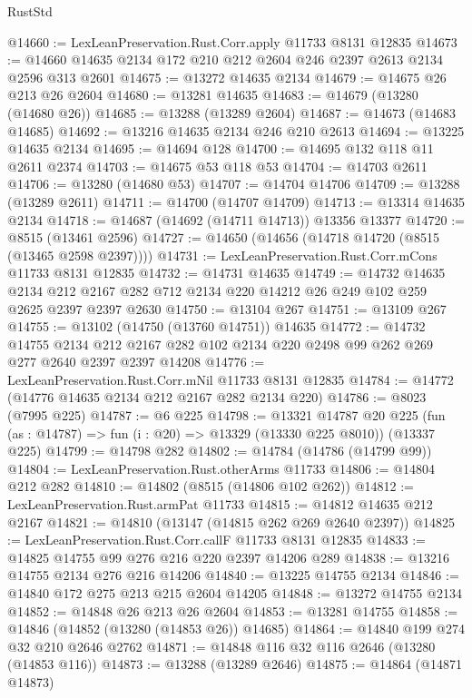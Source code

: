 \begin{lexlean}{RustStd}
\begin{coremodule}
@14660 := LexLeanPreservation.Rust.Corr.apply @11733 @8131 @12835
@14673 := @14660 @14635 @2134 @172 @210 @212 @2604 @246 @2397 @2613 @2134 @2596 @313 @2601
@14675 := @13272 @14635 @2134
@14679 := @14675 @26 @213 @26 @2604
@14680 := @13281 @14635
@14683 := @14679 (@13280 (@14680 @26))
@14685 := @13288 (@13289 @2604)
@14687 := @14673 (@14683 @14685)
@14692 := @13216 @14635 @2134 @246 @210 @2613
@14694 := @13225 @14635 @2134
@14695 := @14694 @128
@14700 := @14695 @132 @118 @11 @2611 @2374
@14703 := @14675 @53 @118 @53
@14704 := @14703 @2611
@14706 := @13280 (@14680 @53)
@14707 := @14704 @14706
@14709 := @13288 (@13289 @2611)
@14711 := @14700 (@14707 @14709)
@14713 := @13314 @14635 @2134
@14718 := @14687 (@14692 (@14711 @14713)) @13356 @13377
@14720 := @8515 (@13461 @2596)
@14727 := @14650 (@14656 (@14718 @14720 (@8515 (@13465 @2598 @2397))))
@14731 := LexLeanPreservation.Rust.Corr.mCons @11733 @8131 @12835
@14732 := @14731 @14635
@14749 := @14732
    @14635
    @2134
    @212
    @2167
    @282
    @712
    @2134
    @220
    @14212
    @26
    @249
    @102
    @259
    @2625
    @2397
    @2397
    @2630
@14750 := @13104 @267
@14751 := @13109 @267
@14755 := @13102 (@14750 (@13760 @14751)) @14635
@14772 := @14732
    @14755
    @2134
    @212
    @2167
    @282
    @102
    @2134
    @220
    @2498
    @99
    @262
    @269
    @277
    @2640
    @2397
    @2397
    @14208
@14776 := LexLeanPreservation.Rust.Corr.mNil @11733 @8131 @12835
@14784 := @14772 (@14776 @14635 @2134 @212 @2167 @282 @2134 @220)
@14786 := @8023 (@7995 @225)
@14787 := @6 @225
@14798 := @13321
    @14787
    @20
    @225
    (fun (as : @14787) => fun (i : @20) => @13329 (@13330 @225 @8010))
    (@13337 @225)
@14799 := @14798 @282
@14802 := @14784 (@14786 (@14799 @99))
@14804 := LexLeanPreservation.Rust.otherArms @11733
@14806 := @14804 @212 @282
@14810 := @14802 (@8515 (@14806 @102 @262))
@14812 := LexLeanPreservation.Rust.armPat @11733
@14815 := @14812 @14635 @212 @2167
@14821 := @14810 (@13147 (@14815 @262 @269 @2640 @2397))
@14825 := LexLeanPreservation.Rust.Corr.callF @11733 @8131 @12835
@14833 := @14825 @14755 @99 @276 @216 @220 @2397 @14206 @289
@14838 := @13216 @14755 @2134 @276 @216 @14206
@14840 := @13225 @14755 @2134
@14846 := @14840 @172 @275 @213 @215 @2604 @14205
@14848 := @13272 @14755 @2134
@14852 := @14848 @26 @213 @26 @2604
@14853 := @13281 @14755
@14858 := @14846 (@14852 (@13280 (@14853 @26)) @14685)
@14864 := @14840 @199 @274 @32 @210 @2646 @2762
@14871 := @14848 @116 @32 @116 @2646 (@13280 (@14853 @116))
@14873 := @13288 (@13289 @2646)
@14875 := @14864 (@14871 @14873)

\end{coremodule}
\end{lexlean}
